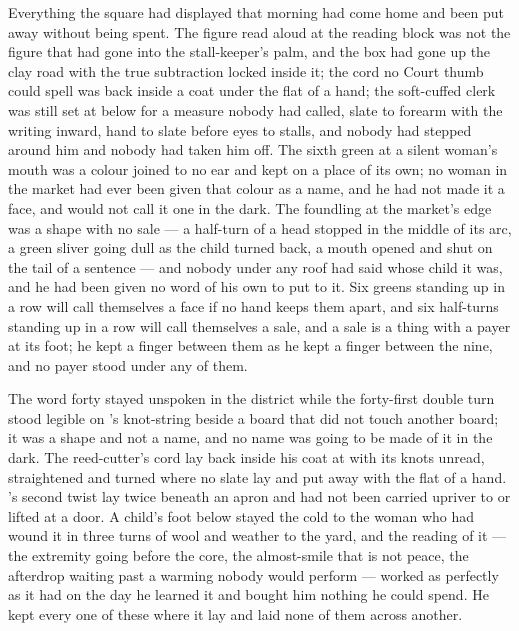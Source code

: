 Everything the square had displayed that morning had come home and been put away without being spent. The figure read aloud at the reading block was not the figure that had gone into the stall-keeper's palm, and the box had gone up the clay road with the true subtraction locked inside it; the cord no Court thumb could spell was back inside a coat under the flat of a hand; the soft-cuffed clerk was still set at  below  for a measure nobody had called, slate to forearm with the writing inward, hand to slate before eyes to stalls, and nobody had stepped around him and nobody had taken him off. The sixth green at a silent woman's mouth was a colour joined to no ear and kept on a place of its own; no woman in the market had ever been given that colour as a name, and he had not made it a face, and would not call it one in the dark. The foundling at the market's edge was a shape with no sale --- a half-turn of a head stopped in the middle of its arc, a green sliver going dull as the child turned back, a mouth opened and shut on the tail of a sentence --- and nobody under any roof had said whose child it was, and he had been given no word of his own to put to it. Six greens standing up in a row will call themselves a face if no hand keeps them apart, and six half-turns standing up in a row will call themselves a sale, and a sale is a thing with a payer at its foot; he kept a finger between them as he kept a finger between the nine, and no payer stood under any of them.

The word forty stayed unspoken in the district while the forty-first double turn stood legible on 's knot-string beside a board that did not touch another board; it was a shape and not a name, and no name was going to be made of it in the dark. The reed-cutter's cord lay back inside his coat at  with its knots unread, straightened and turned where no slate lay and put away with the flat of a hand. 's second twist lay twice beneath an apron and had not been carried upriver to  or lifted at a door. A child's foot below  stayed the cold to the woman who had wound it in three turns of wool and weather to the yard, and the reading of it --- the extremity going before the core, the almost-smile that is not peace, the afterdrop waiting past a warming nobody would perform --- worked as perfectly as it had on the day he learned it and bought him nothing he could spend. He kept every one of these where it lay and laid none of them across another.

